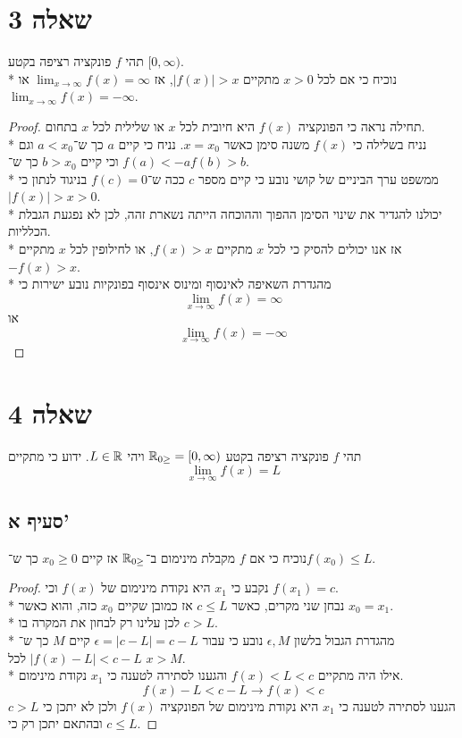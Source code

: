 \section{שאלה 3}
תהי $f$ פונקציה רציפה בקטע $[0, \infty)$. \\* %
נוכיח כי אם לכל $x > 0$ מתקיים $|f(x)| > x$, אז $\lim_{x \to \infty} f(x) = \infty$ או $\lim_{x \to \infty} f(x) = -\infty$.
\begin{proof}
	תחילה נראה כי הפונקציה $f(x)$ היא חיובית לכל $x$ או שלילית לכל $x$ בתחום. \\*
	נניח בשלילה כי $f(x)$ משנה סימן כאשר $x = x_0$.
	נניח כי קיים $a$ כך ש־$a < x_0$ וגם $f(a) < -a$ וכי קיים $b > x_0$ כך ש־$f(b) > b$. \\*
	ממשפט ערך הביניים של קושי נובע כי קיים מספר $c$ ככה ש־$f(c) = 0$ בניגוד לנתון כי $|f(x)| > x > 0$. \\*
	יכולנו להגדיר את שינוי הסימן ההפוך וההוכחה הייתה נשארת זהה, לכן לא נפגעת הגבלת הכלליות. \\*
	אז אנו יכולים להסיק כי לכל $x$ מתקיים $f(x) > x$, או לחילופין לכל $x$ מתקיים $-f(x) > x$. \\*
	מהגדרת השאיפה לאינסוף ומינוס אינסוף בפונקיות נובע ישירות כי
	\[
		\lim_{x \to \infty} f(x) = \infty
	\]
	או
	\[
		\lim_{x \to \infty} f(x) = -\infty
	\]
\end{proof}

\section{שאלה 4}
תהי $f$ פונקציה רציפה בקטע $\mathbb{R}_{0\ge} = [0, \infty)$ ויהי $L \in \mathbb{R}$. ידוע כי מתקיים %
\[
	\lim_{x \to \infty} f(x) = L
\]

\subsection{סעיף א'}
נוכיח כי אם $f$ מקבלת מינימום ב־$\mathbb{R}_{0\ge}$ אז קיים $x_0 \ge 0$ כך ש־$f(x_0) \le L$.
\begin{proof}
	נקבע כי $x_1$ היא נקודת מינימום של $f(x)$ וכי $f(x_1) = c$. \\*
	נבחן שני מקרים, כאשר $c \le L$ אז כמובן שקיים $x_0$ כזה, והוא כאשר $x_0 = x_1$. \\*
	לכן עלינו רק לבחון את המקרה בו $c > L$. \\*
	מהגדרת הגבול בלשון $\epsilon, M$ נובע כי עבור $\epsilon = |c - L| = c - L$ קיים $M$ כך ש־$|f(x) - L| < c - L$ לכל $x > M$. \\*
	אילו היה מתקיים $f(x) < L < c$ והגענו לסתירה לטענה כי $x_1$ נקודת מינימום.
	\[
		f(x) - L < c - L \rightarrow f(x) < c
	\]
	הגענו לסתירה לטענה כי $x_1$ היא נקודת מינימום של הפונקציה $f(x)$ ולכן לא יתכן כי $c > L$ ובהתאם יתכן רק כי $c \le L$.
\end{proof}

